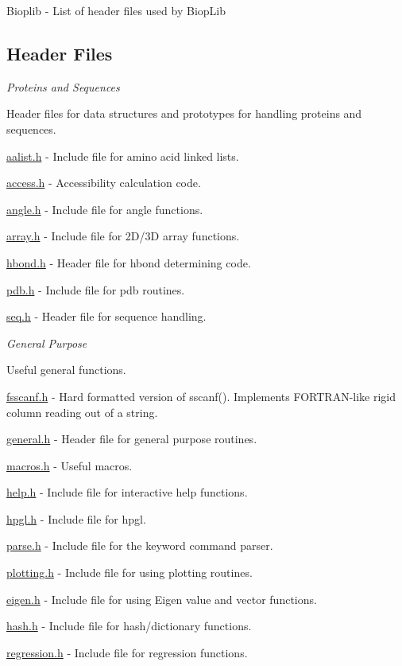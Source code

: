 Bioplib -\/ List of header files used by Biop\-Lib

\subsection*{Header Files }

{\itshape Proteins and Sequences}

Header files for data structures and prototypes for handling proteins and sequences.


\begin{DoxyItemize}
\item \hyperlink{aalist_8h}{aalist.\-h} -\/ Include file for amino acid linked lists.
\item \hyperlink{access_8h}{access.\-h} -\/ Accessibility calculation code.
\item \hyperlink{angle_8h}{angle.\-h} -\/ Include file for angle functions.
\item \hyperlink{array_8h}{array.\-h} -\/ Include file for 2\-D/3\-D array functions.
\item \hyperlink{hbond_8h}{hbond.\-h} -\/ Header file for hbond determining code.
\item \hyperlink{pdb_8h}{pdb.\-h} -\/ Include file for pdb routines.
\item \hyperlink{seq_8h}{seq.\-h} -\/ Header file for sequence handling.
\end{DoxyItemize}

{\itshape General Purpose}

Useful general functions.


\begin{DoxyItemize}
\item \hyperlink{fsscanf_8h}{fsscanf.\-h} -\/ Hard formatted version of sscanf(). Implements F\-O\-R\-T\-R\-A\-N-\/like rigid column reading out of a string.
\item \hyperlink{general_8h}{general.\-h} -\/ Header file for general purpose routines.
\item \hyperlink{macros_8h}{macros.\-h} -\/ Useful macros.
\item \hyperlink{help_8h}{help.\-h} -\/ Include file for interactive help functions.
\item \hyperlink{hpgl_8h}{hpgl.\-h} -\/ Include file for hpgl.
\item \hyperlink{parse_8h}{parse.\-h} -\/ Include file for the keyword command parser.
\item \hyperlink{plotting_8h}{plotting.\-h} -\/ Include file for using plotting routines.
\item \hyperlink{eigen_8h}{eigen.\-h} -\/ Include file for using Eigen value and vector functions.
\item \hyperlink{hash_8h}{hash.\-h} -\/ Include file for hash/dictionary functions.
\item \hyperlink{regression_8h}{regression.\-h} -\/ Include file for regression functions.
\end{DoxyItemize}

